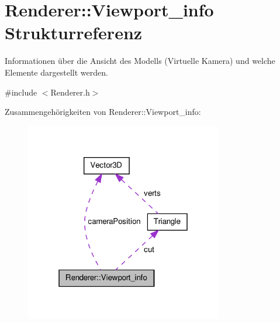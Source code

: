 \hypertarget{structRenderer_1_1Viewport__info}{\section{Renderer\-:\-:Viewport\-\_\-info Strukturreferenz}
\label{structRenderer_1_1Viewport__info}
}


Informationen über die Ansicht des Modells (Virtuelle Kamera) und welche Elemente dargestellt werden.  




{\ttfamily \#include $<$Renderer.\-h$>$}



Zusammengehörigkeiten von Renderer\-:\-:Viewport\-\_\-info\-:\nopagebreak
\begin{figure}[H]
\begin{center}
\leavevmode
\includegraphics[width=244pt]{structRenderer_1_1Viewport__info__coll__graph}
\end{center}
\end{figure}
